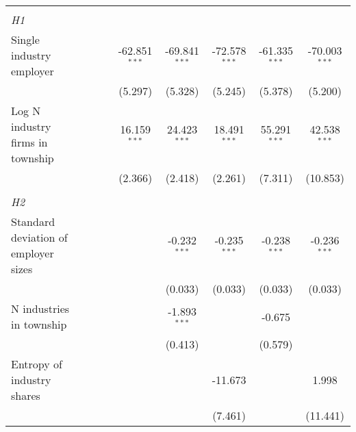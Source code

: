 \begin{tabular}{lcccccccc}
\hdashline %
\\[0.1ex] %
\emph{H1} \\ 
   Single industry employer                              &                  &                 &                  & -62.851$^{***}$  & -69.841$^{***}$  & -72.578$^{***}$  & -61.335$^{***}$  & -70.003$^{***}$\\   
                                                         &                  &                 &                  & (5.297)          & (5.328)          & (5.245)          & (5.378)          & (5.200)\\   
   Log N industry firms in township                      &                  &                 &                  & 16.159$^{***}$   & 24.423$^{***}$   & 18.491$^{***}$   & 55.291$^{***}$   & 42.538$^{***}$\\   
                                                         &                  &                 &                  & (2.366)          & (2.418)          & (2.261)          & (7.311)          & (10.853)\\   
\hdashline %
\\[0.1ex] %
\emph{H2} \\ 
   Standard deviation of employer sizes                  &                  &                 &                  &                  & -0.232$^{***}$   & -0.235$^{***}$   & -0.238$^{***}$   & -0.236$^{***}$\\   
                                                         &                  &                 &                  &                  & (0.033)          & (0.033)          & (0.033)          & (0.033)\\   
   N industries in township                              &                  &                 &                  &                  & -1.893$^{***}$   &                  & -0.675           &   \\   
                                                         &                  &                 &                  &                  & (0.413)          &                  & (0.579)          &   \\   
   Entropy of industry shares                            &                  &                 &                  &                  &                  & -11.673          &                  & 1.998\\   
                                                         &                  &                 &                  &                  &                  & (7.461)          &                  & (11.441)\\   

\end{tabular}
